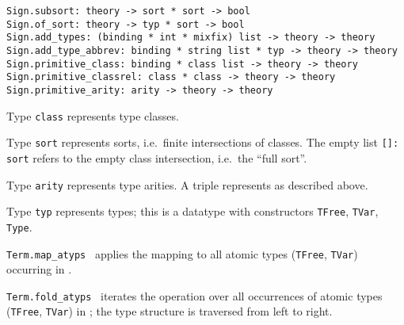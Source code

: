 \begin{isabellebody}
\begin{isamarkuptext}
  \begin{mldecls}
  \verb|Sign.subsort: theory -> sort * sort -> bool| \\
  \verb|Sign.of_sort: theory -> typ * sort -> bool| \\
  \verb|Sign.add_types: (binding * int * mixfix) list -> theory -> theory| \\
  \verb|Sign.add_type_abbrev: binding * string list * typ -> theory -> theory| \\
  \verb|Sign.primitive_class: binding * class list -> theory -> theory| \\
  \verb|Sign.primitive_classrel: class * class -> theory -> theory| \\
  \verb|Sign.primitive_arity: arity -> theory -> theory| \\
  \end{mldecls}

  \begin{description}

  \item Type \verb|class| represents type classes.

  \item Type \verb|sort| represents sorts, i.e.\ finite
  intersections of classes.  The empty list \verb|[]: sort| refers to
  the empty class intersection, i.e.\ the ``full sort''.

  \item Type \verb|arity| represents type arities.  A triple
   represents  as described above.

  \item Type \verb|typ| represents types; this is a datatype with
  constructors \verb|TFree|, \verb|TVar|, \verb|Type|.

  \item \verb|Term.map_atyps|~ applies the mapping  to all atomic types (\verb|TFree|, \verb|TVar|) occurring in
  \isa{{\isasymtau}}.

  \item \verb|Term.fold_atyps|~ iterates the operation
   over all occurrences of atomic types (\verb|TFree|, \verb|TVar|) in \isa{{\isasymtau}}; the type structure is traversed from left to
  right.


\end{description}
\end{isamarkuptext}
\end{isabellebody}
